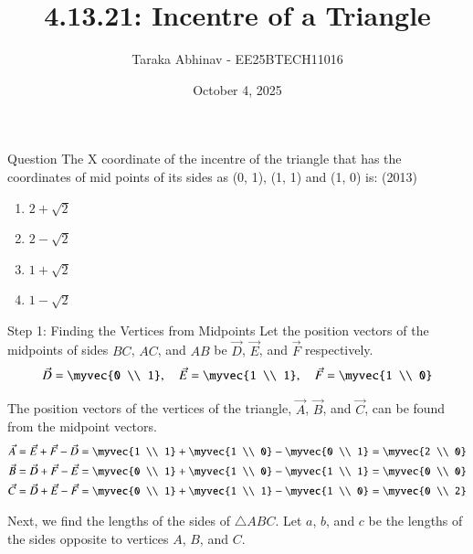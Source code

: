 \documentclass{beamer}
\title %
{4.13.21: Incentre of a Triangle}
\date{October 4, 2025}
\author 
{Taraka Abhinav - EE25BTECH11016}
\begin{document}
\frame{\titlepage}

\begin{frame}{Question}
The X coordinate of the incentre of the triangle that has the coordinates of mid points of its sides as (0, 1), (1, 1) and (1, 0) is: \hfill (2013)

\begin{enumerate}
    \item $2 + \sqrt{2}$
    \item $2 - \sqrt{2}$
    \item $1 + \sqrt{2}$
    \item $1 - \sqrt{2}$
\end{enumerate}
\end{frame}

\begin{frame}{Step 1: Finding the Vertices from Midpoints}
Let the position vectors of the midpoints of sides $BC$, $AC$, and $AB$ be $\vec{D}$, $\vec{E}$, and $\vec{F}$ respectively.
\begin{align}
\vec{D} = \myvec{0 \\ 1}, \quad \vec{E} = \myvec{1 \\ 1}, \quad \vec{F} = \myvec{1 \\ 0}
\end{align}

The position vectors of the vertices of the triangle, $\vec{A}$, $\vec{B}$, and $\vec{C}$, can be found from the midpoint vectors.
\begin{align}
\vec{A} &= \vec{E} + \vec{F} - \vec{D} = \myvec{1 \\ 1} + \myvec{1 \\ 0} - \myvec{0 \\ 1} = \myvec{2 \\ 0} \\
\vec{B} &= \vec{D} + \vec{F} - \vec{E} = \myvec{0 \\ 1} + \myvec{1 \\ 0} - \myvec{1 \\ 1} = \myvec{0 \\ 0} \\
\vec{C} &= \vec{D} + \vec{E} - \vec{F} = \myvec{0 \\ 1} + \myvec{1 \\ 1} - \myvec{1 \\ 0} = \myvec{0 \\ 2}
\end{align}

Next, we find the lengths of the sides of $\triangle ABC$. Let $a$, $b$, and $c$ be the lengths of the sides opposite to vertices $A$, $B$, and $C$.
\end{frame}
\end{document}
